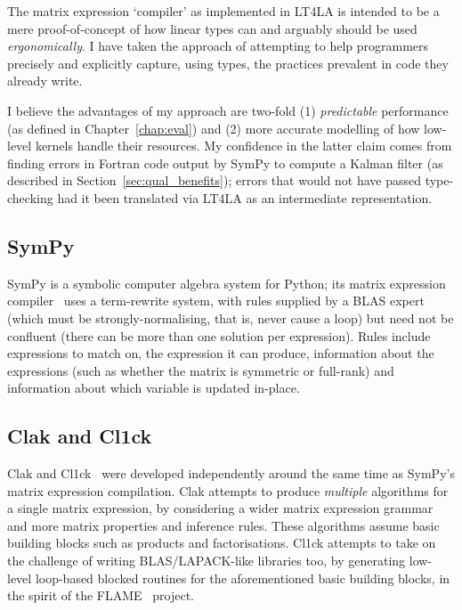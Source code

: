 The matrix expression `compiler' as implemented in LT4LA is intended to be a
mere proof-of-concept of how linear types can and arguably should be used
\emph{ergonomically}. I have taken the approach of attempting to help
programmers precisely and explicitly capture, using types, the practices
prevalent in code they already write.

I believe the advantages of my approach are two-fold (1) \emph{predictable}
performance (as defined in Chapter~\ref{chap:eval}) and (2) more accurate
modelling of how low-level kernels handle their resources. My confidence in the
latter claim comes from finding errors in Fortran code output by SymPy to
compute a Kalman filter (as described in Section~\ref{sec:qual_benefits});
errors that would not have passed type-checking had it been translated via
LT4LA as an intermediate representation.

\subsection{SymPy}

SymPy is a symbolic computer algebra system for Python; its matrix expression
compiler~\cite{rocklin_thesis} uses a term-rewrite system, with rules supplied
by a BLAS expert (which must be strongly-normalising, that is, never cause a
loop) but need not be confluent (there can be more than one solution per
expression). Rules include expressions to match on, the expression it can
produce, information about the expressions (such as whether the matrix is
symmetric or full-rank) and information about which variable is updated
in-place.

\subsection{Clak and Cl1ck}

Clak and Cl1ck~\cite{fabregat_thesis} were developed independently around the
same time as SymPy's matrix expression compilation. Clak attempts to produce
\emph{multiple} algorithms for a single matrix expression, by considering a
wider matrix expression grammar and more matrix properties and inference rules.
These algorithms assume basic building blocks such as products and
factorisations. Cl1ck attempts to take on the challenge of writing
BLAS/LAPACK-like libraries too, by generating low-level loop-based blocked
routines for the aforementioned basic building blocks, in the spirit of the
FLAME~\cite{gunnels_flame} project.

